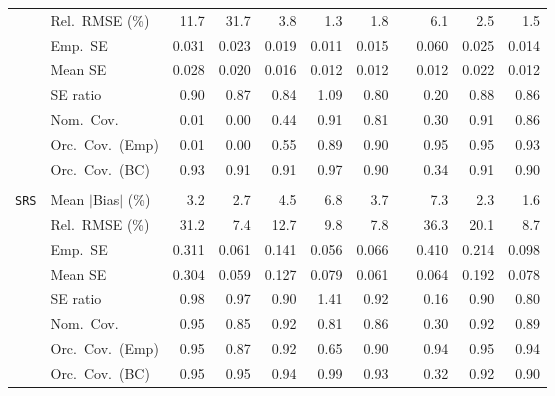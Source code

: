\begin{landscape}
\begin{longtable}{llrrrrrrrrr}
 & Rel.\ RMSE (\%) & 11.7 & 31.7 & 3.8 & \cellcolor{rankone}1.3 & \cellcolor{rankthree}1.8 &  & 6.1 & 2.5 & \cellcolor{ranktwo}1.5 \\
 & Emp.\ SE & 0.031 & 0.023 & 0.019 & 0.011 & 0.015 &  & 0.060 & 0.025 & 0.014 \\
 & Mean SE & 0.028 & 0.020 & 0.016 & 0.012 & 0.012 &  & 0.012 & 0.022 & 0.012 \\
 & SE ratio & \cellcolor{ranktwo}0.90 & 0.87 & 0.84 & \cellcolor{rankone}1.09 & 0.80 &  & 0.20 & \cellcolor{rankthree}0.88 & 0.86 \\
 & Nom.\ Cov. & 0.01 & 0.00 & 0.44 & \cellcolor{rankone}0.91 & \cellcolor{rankthree}0.81 &  & 0.30 & \cellcolor{rankone}0.91 & \cellcolor{ranktwo}0.86 \\
 & Orc.\ Cov.\ (Emp) & 0.01 & 0.00 & 0.55 & 0.89 & \cellcolor{rankthree}0.90 &  & \cellcolor{rankone}0.95 & \cellcolor{rankone}0.95 & \cellcolor{ranktwo}0.93 \\
 & Orc.\ Cov.\ (BC) & \cellcolor{rankone}0.93 & \cellcolor{ranktwo}0.91 & \cellcolor{ranktwo}0.91 & \cellcolor{rankone}0.97 & \cellcolor{rankthree}0.90 &  & 0.34 & \cellcolor{ranktwo}0.91 & \cellcolor{rankthree}0.90 \\
\addlinespace[2pt]
\multicolumn{11}{l}{\textbf{Binary \& Categorical Phase-One Covariates}} \\
\addlinespace[2pt]
\quad \texttt{SRS} & Mean $|$Bias$|$ (\%) & 3.2 & \cellcolor{rankthree}2.7 & 4.5 & 6.8 & 3.7 &  & 7.3 & \cellcolor{ranktwo}2.3 & \cellcolor{rankone}1.6 \\
 & Rel.\ RMSE (\%) & 31.2 & \cellcolor{rankone}7.4 & 12.7 & 9.8 & \cellcolor{ranktwo}7.8 &  & 36.3 & 20.1 & \cellcolor{rankthree}8.7 \\
 & Emp.\ SE & 0.311 & 0.061 & 0.141 & 0.056 & 0.066 &  & 0.410 & 0.214 & 0.098 \\
 & Mean SE & 0.304 & 0.059 & 0.127 & 0.079 & 0.061 &  & 0.064 & 0.192 & 0.078 \\
 & SE ratio & \cellcolor{rankone}0.98 & \cellcolor{ranktwo}0.97 & 0.90 & 1.41 & \cellcolor{rankthree}0.92 &  & 0.16 & 0.90 & 0.80 \\
 & Nom.\ Cov. & \cellcolor{rankone}0.95 & 0.85 & \cellcolor{ranktwo}0.92 & 0.81 & 0.86 &  & 0.30 & \cellcolor{ranktwo}0.92 & \cellcolor{rankthree}0.89 \\
 & Orc.\ Cov.\ (Emp) & \cellcolor{rankone}0.95 & 0.87 & \cellcolor{rankthree}0.92 & 0.65 & 0.90 &  & \cellcolor{ranktwo}0.94 & \cellcolor{rankone}0.95 & \cellcolor{ranktwo}0.94 \\
 & Orc.\ Cov.\ (BC) & \cellcolor{rankone}0.95 & \cellcolor{rankone}0.95 & \cellcolor{ranktwo}0.94 & 0.99 & \cellcolor{rankthree}0.93 &  & 0.32 & 0.92 & 0.90 \\

\end{longtable}
\end{landscape}
